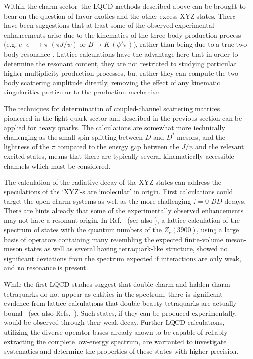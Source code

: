 Within the charm sector, the LQCD methods described above can be brought to bear on the question of flavor exotics and the other excess XYZ states. There have been suggestions that at least some of the observed experimental enhancements arise due to the kinematics of the three-body production process (e.g. $e^+e^- \to \pi \; (\pi J/\psi) $ or $B \to K \, (\psi' \pi)$), rather than being due to a true two-body resonance \cite{Szczepaniak:2015eza}. Lattice calculations have the advantage here that in order to determine the resonant content, they are not restricted to studying particular higher-multiplicity production processes, but rather they can compute the two-body scattering amplitude directly, removing the effect of any kinematic singularities particular to the production mechanism.


The techniques for determination of coupled-channel scattering matrices pioneered in the light-quark sector and described in the previous section can be applied for heavy quarks. The calculations are somewhat more technically challenging as the small spin-splitting between $D$ and $D^*$ mesons, and the lightness of the $\pi$ compared to the energy gap between the $J/\psi$ and the relevant excited states, means that there are typically several kinematically accessible channels which must be considered.

The calculation of the radiative decay of the XYZ states can address the speculations of the `XYZ'-s are `molecular' in origin. First calculations could target the open-charm systems as well as the more challenging $I=0$ $D\bar{D}$ decays.
%
There are hints already that some of the experimentally observed enhancements may not have a resonant origin. In Ref.~\cite{Cheung:2017tnt} (see also \cite{Prelovsek:2014swa}), a lattice calculation of the spectrum of states with the quantum numbers of the $Z_c(3900)$, using a large basis of operators containing many resembling the expected finite-volume meson-meson states as well as several having tetraquark-like structure, showed no significant deviations from the spectrum expected if interactions are only weak, and no resonance is present. 

While the first LQCD studies suggest that double charm and hidden charm tetraquarks do not appear as entities in the spectrum, there is significant evidence from lattice calculations that double beauty tetraquarks are actually {bound}~\cite{Francis:2016hui, Junnarkar:2018twb, Leskovec:2019ioa} (see also Refs.~\cite{Hughes:2017xie, Francis:2018jyb}). Such states, if they can be produced experimentally, would be observed through their weak decay. Further LQCD calculations, utilizing the diverse operator bases already shown to be capable of  reliably extracting the complete low-energy spectrum, are warranted to investigate systematics and determine the properties of these states with higher precision.

